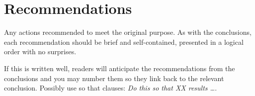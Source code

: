 \chapter{Recommendations}

 Any actions recommended to meet the original purpose. As with the
 conclusions, each recommendation should be brief and self-contained,
 presented in a logical order with no surprises.

If this is written well, readers will anticipate the recommendations
from the conclusions and you may number them so they link back to the
relevant conclusion. Possibly use so that clauses: {\em Do this so
  that XX results \ldots}.

